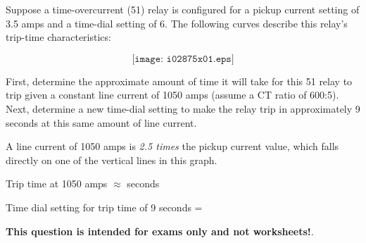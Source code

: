 

Suppose a time-overcurrent (51) relay is configured for a pickup current setting of 3.5 amps and a time-dial setting of 6.  The following curves describe this relay's trip-time characteristics:

$$\texttt{[image: i02875x01.eps]}$$

First, determine the approximate amount of time it will take for this 51 relay to trip given a constant line current of 1050 amps (assume a CT ratio of 600:5).  Next, determine a new time-dial setting to make the relay trip in approximately 9 seconds at this same amount of line current.







A line current of 1050 amps is {\it 2.5 times} the pickup current value, which falls directly on one of the vertical lines in this graph.

\vskip 10pt

Trip time at 1050 amps $\approx$  seconds 

\vskip 10pt

Time dial setting for trip time of 9 seconds =  







{\bf This question is intended for exams only and not worksheets!}.



